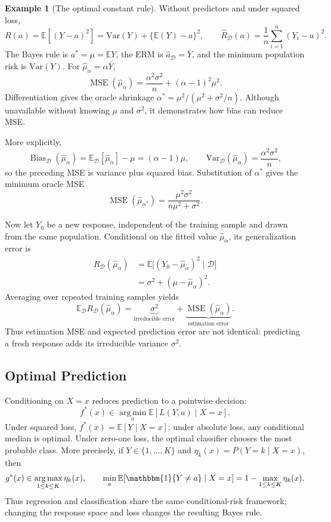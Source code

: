\documentclass[12pt,oneside]{book}
\numberwithin{equation}{section}
\theoremstyle{definition}
\newtheorem{example}{Example}[section]
\theoremstyle{plain}
\theoremstyle{remark}
\newcommand{\E}{\mathbb{E}}
\newcommand{\Var}{\mathrm{Var}}
\newcommand{\ind}{\mathbbm{1}}
\newcommand{\argmin}{\operatorname*{arg\,min}}
\newcommand{\argmax}{\operatorname*{arg\,max}}
\begin{document}
\begin{example}[The optimal constant rule]
Without predictors and under squared loss,
\[
 R(a)=\E[(Y-a)^2]=\Var(Y)+\{\E(Y)-a\}^2,
 \qquad
 \widehat R_{\mathcal D}(a)=\frac1n\sum_{i=1}^n(Y_i-a)^2.
\]
The Bayes rule is $a^*=\mu=\E Y$, the ERM is
$\widehat a_{\mathcal D}=\bar Y$, and the minimum population risk is
$\Var(Y)$. For $\widehat\mu_\alpha=\alpha\bar Y$,
\[
 \operatorname{MSE}(\widehat\mu_\alpha)
 =\frac{\alpha^2\sigma^2}{n}+(\alpha-1)^2\mu^2.
\]
Differentiation gives the oracle shrinkage
$\alpha^*=\mu^2/(\mu^2+\sigma^2/n)$. Although unavailable without knowing
$\mu$ and $\sigma^2$, it demonstrates how bias can reduce MSE.

More explicitly,
\[
 \operatorname{Bias}_{\mathcal D}(\widehat\mu_\alpha)
 =\E_{\mathcal D}[\widehat\mu_\alpha]-\mu
 =(\alpha-1)\mu,
 \qquad
 \Var_{\mathcal D}(\widehat\mu_\alpha)
 =\frac{\alpha^2\sigma^2}{n},
\]
so the preceding MSE is variance plus squared bias. Substitution of
$\alpha^*$ gives the minimum oracle MSE
\[
 \operatorname{MSE}(\widehat\mu_{\alpha^*})
 =\frac{\mu^2\sigma^2}{n\mu^2+\sigma^2}.
\]

Now let $Y_0$ be a new response, independent of the training sample and drawn
from the same population. Conditional on the fitted value
$\widehat\mu_\alpha$, its generalization error is
\begin{align*}
 R_{\mathcal D}(\widehat\mu_\alpha)
 &=\E\bigl[(Y_0-\widehat\mu_\alpha)^2\mid\mathcal D\bigr]\\
 &=\sigma^2+(\mu-\widehat\mu_\alpha)^2.
\end{align*}
Averaging over repeated training samples yields
\[
 \E_{\mathcal D}R_{\mathcal D}(\widehat\mu_\alpha)
 =\underbrace{\sigma^2}_{\text{irreducible error}}
 +\underbrace{\operatorname{MSE}(\widehat\mu_\alpha)}_{\text{estimation error}}.
\]
Thus estimation MSE and expected prediction error are not identical: predicting
a fresh response adds its irreducible variance $\sigma^2$.
\end{example}

\subsection{Optimal Prediction}

Conditioning on $X=x$ reduces prediction to a pointwise decision:
\begin{equation}
    f^*(x)\in\argmin_a\E[L(Y,a)\mid X=x].
    \label{eq:bayes-predictor}
\end{equation}
Under squared loss, $f^*(x)=\E[Y\mid X=x]$; under absolute loss, any
conditional median is optimal. Under zero-one loss, the optimal classifier
chooses the most probable class. More precisely, if
$Y\in\{1,\ldots,K\}$ and $\eta_k(x)=P(Y=k\mid X=x)$, then
\[
 g^*(x)\in\argmax_{1\leq k\leq K}\eta_k(x),
 \qquad
 \min_a\E[\ind\{Y\neq a\}\mid X=x]
 =1-\max_{1\leq k\leq K}\eta_k(x).
\]
Thus regression and classification share the same conditional-risk framework;
changing the response space and loss changes the resulting Bayes rule.
\end{document}
